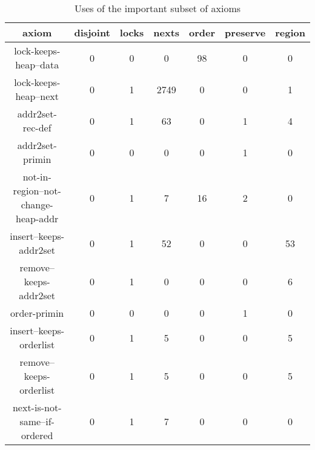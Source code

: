 \begin{table}
        \centering
        \begin{tabular}{c|cccccc}
        axiom & disjoint & locks & nexts & order & preserve & region 
        \\\hline
                lock-keeps-heap--data & 0 & 0 & 0 & 98 & 0 & 0 
                \\
                lock-keeps-heap--next & 0 & 1 & 2749 & 0 & 0 & 1 
                \\
                addr2set-rec-def & 0 & 1 & 63 & 0 & 1 & 4 
                \\
                addr2set-primin & 0 & 0 & 0 & 0 & 1 & 0 
                \\
                not-in-region--not-change-heap-addr & 0 & 1 & 7 & 16 & 2 & 0 
                \\
                insert--keeps-addr2set & 0 & 1 & 52 & 0 & 0 & 53 
                \\
                remove--keeps-addr2set & 0 & 1 & 0 & 0 & 0 & 6 
                \\
  	            order-primin & 0 & 0 & 0 & 0 & 1 & 0 
                \\
                insert--keeps-orderlist & 0 & 1 & 5 & 0 & 0 & 5
                \\
                remove--keeps-orderlist & 0 & 1 & 5 & 0 & 0 & 5 
                \\
                next-is-not-same--if-ordered & 0 & 1 & 7 & 0 & 0 & 0 
                \\
        \end{tabular}
\label{table:axiom_important}
\caption{Uses of the important subset of axioms}
\end{table}


